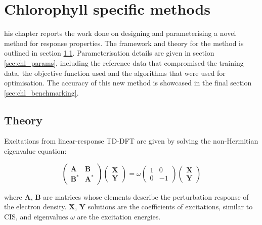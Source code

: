 %
%
\let\textcircled=\pgftextcircled
\chapter{Chlorophyll specific methods}
\label{chap:chl_xtb}

his chapter reports the work done on designing and parameterising a
novel method for response properties. The framework and theory for the method is
outlined in section \ref{sec:theory}. Parameterisation details are given in 
section \ref{sec:chl_params}, including the reference data that compromised the 
training data, the objective function used and the algorithms that were used for
optimisation. The accuracy of this new method is showcased in the final section 
\ref{sec:chl_benchmarking}.

\section{Theory}
\label{sec:theory}
Excitations from linear-response TD-DFT are given by solving the non-Hermitian
eigenvalue equation:

\begin{equation}
    \begin{pmatrix}
        \mathbf{A}   & \mathbf{B} \\
        \mathbf{B}^\ast  & \mathbf{A}^\ast
    \end{pmatrix}
    \begin{pmatrix}
        \mathbf{X} \\
        \mathbf{Y}
    \end{pmatrix}
    = 
    \omega
    \begin{pmatrix}
        1 & 0 \\
        0 & -1
    \end{pmatrix}
    \begin{pmatrix}
        \mathbf{X} \\
        \mathbf{Y}
    \end{pmatrix}
\end{equation}

where $\mathbf{A}$, $\mathbf{B}$ are matrices whose elements describe the perturbation
response of the electron density. $\mathbf{X}$, $\mathbf{Y}$ solutions are the 
coefficients of excitations, similar to CIS, and eigenvalues $\omega$ are the 
excitation energies.

